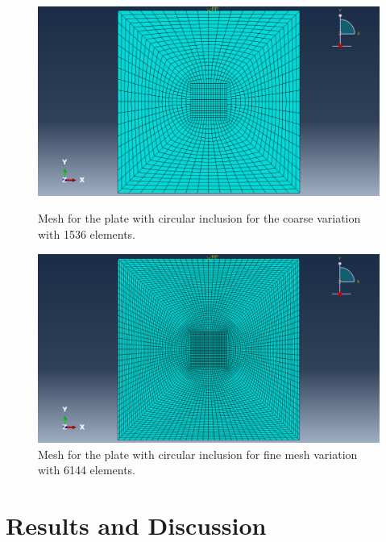 \documentclass[12pt]{article}
\begin{document}
\begin{figure}[H]
    \centering
    \begin{minipage}{0.48\textwidth}
        \centering
        \includegraphics[width=\textwidth]{images/MeshQ2.1.png}
        \caption{Mesh for the plate with circular inclusion for the coarse variation
        with 1536 elements.}
        \label{fig:MeshQ2.1}
    \end{minipage}\hfill
    \begin{minipage}{0.48\textwidth}
        \centering
        \includegraphics[width=\textwidth]{images/MeshQ2.2.png}
        \caption{Mesh for the plate with circular inclusion for fine mesh variation
        with 6144 elements.}
        \label{fig:MeshQ2.2}
    \end{minipage}
\end{figure}
\section*{Results and Discussion}
\end{document}
